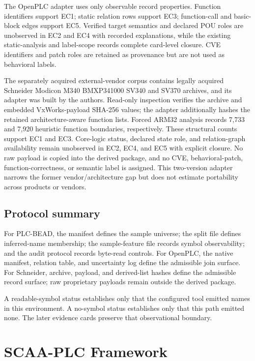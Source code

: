 \documentclass[a4paper,fleqn]{cas-dc}
\begin{document}
The OpenPLC adapter uses only observable record properties. Function identifiers support EC1; static relation rows support EC3; function-call and basic-block edges support EC5. Verified target semantics and declared POU roles are unobserved in EC2 and EC4 with recorded explanations, while the existing static-analysis and label-scope records complete card-level closure. CVE identifiers and patch roles are retained as provenance but are not used as behavioral labels.

The separately acquired external-vendor corpus contains legally acquired Schneider Modicon M340 BMXP341000 SV340 and SV370 archives, and its adapter was built by the authors. Read-only inspection verifies the archive and embedded VxWorks-payload SHA-256 values; the adapter additionally hashes the retained architecture-aware function lists. Forced ARM32 analysis records 7{,}733 and 7{,}920 heuristic function boundaries, respectively. These structural counts support EC1 and EC3. Core-logic status, declared state role, and relation-graph availability remain unobserved in EC2, EC4, and EC5 with explicit closure. No raw payload is copied into the derived package, and no CVE, behavioral-patch, function-correctness, or semantic label is assigned. This two-version adapter narrows the former vendor/architecture gap but does not estimate portability across products or vendors.

\subsection{Protocol summary}

For PLC-BEAD, the manifest defines the sample universe; the split file defines inferred-name membership; the sample-feature file records symbol observability; and the audit protocol records byte-read controls. For OpenPLC, the native manifest, relation table, and uncertainty log define the admissible join surface. For Schneider, archive, payload, and derived-list hashes define the admissible record surface; raw proprietary payloads remain outside the derived package.

A readable-symbol status establishes only that the configured tool emitted names in this environment. A no-symbol status establishes only that this path emitted none. The later evidence cards preserve that observational boundary.



\section{SCAA-PLC Framework}
\end{document}
